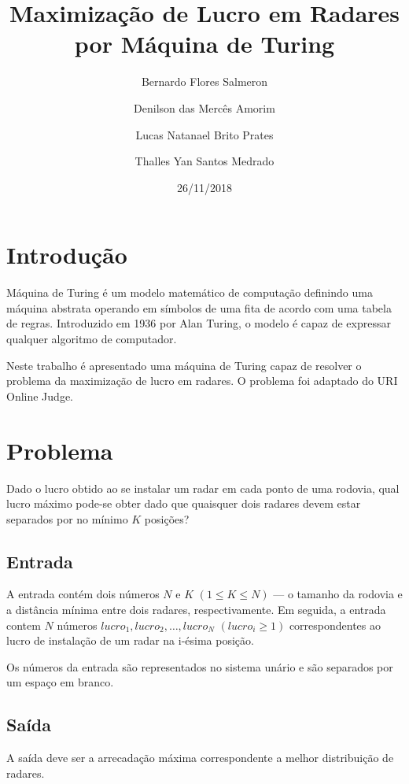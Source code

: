 \documentclass[a4paper]{article}
\title{Maximização de Lucro em Radares por Máquina de Turing}
\author{
  Bernardo Flores Salmeron\\
  \and
  Denilson das Mercês Amorim\\
  \and
  Lucas Natanael Brito Prates\\
  \and
  Thalles Yan Santos Medrado
}
\date{26/11/2018}
\begin{document}
\maketitle

\section{Introdução}

Máquina de Turing é um modelo matemático de computação definindo uma máquina abstrata operando em símbolos de uma fita de acordo com uma tabela de regras. Introduzido em 1936 por Alan Turing, o modelo é capaz de expressar qualquer algoritmo de computador.

Neste trabalho é apresentado uma máquina de Turing capaz de resolver o problema da maximização de lucro em radares. O problema foi adaptado do URI Online Judge\cite{uriproblem}.

\section{Problema}


Dado o lucro obtido ao se instalar um radar em cada ponto de uma rodovia, qual lucro máximo pode-se obter dado que quaisquer dois radares devem estar separados por no mínimo $K$ posições?


    \subsection{Entrada}
       A entrada contém dois números $N$ e $K$ $(1 \leq K \leq N)$ — o tamanho da rodovia e a distância mínima entre dois radares, respectivamente. Em seguida, a entrada contem $N$ números $lucro_{1}, lucro_{2}, \dots, lucro_{N}$ $(lucro_{i} \geq 1)$ correspondentes ao lucro de instalação de um radar na i-ésima posição.
       
       Os números da entrada são representados no sistema unário e são separados por um espaço em branco.

    \subsection{Saída} 
        A saída deve ser a arrecadação máxima correspondente a melhor distribuição de radares.
    
\end{document}

